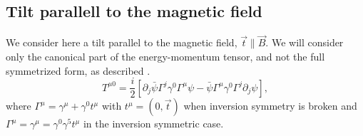 \subsection{Tilt parallell to the magnetic field}
We consider here a tilt parallel to the magnetic field, \( \vec{t} \parallel \vec{B} \). We will consider only the canonical part of the energy-momentum tensor, and not the full symmetrized form, as described \citeauthor{vanderwurffMagnetovorticalThermoelectricTransport2019} \cite{vanderwurffMagnetovorticalThermoelectricTransport2019}.
\begin{equation}
  \label{eq:103}
  T^{\mu 0} = \frac{i}{2}
  [
  \partial_j \bar{\psi} \Gamma ^j \gamma ^0 \Gamma ^{\mu } \psi - \bar{\psi} \Gamma ^{\mu } \gamma ^0 \Gamma ^j \partial _j \psi
  ],
\end{equation}
where \( \Gamma ^{\mu } = \gamma ^{\mu } + \gamma ^0 t^{\mu } \) with \( t^{\mu } = (0, \vec{t}) \) when inversion symmetry is broken and \( \Gamma ^{\mu }= \gamma ^{\mu } = \gamma ^0 \gamma ^5 t^{\mu } \) in the inversion symmetric case.

